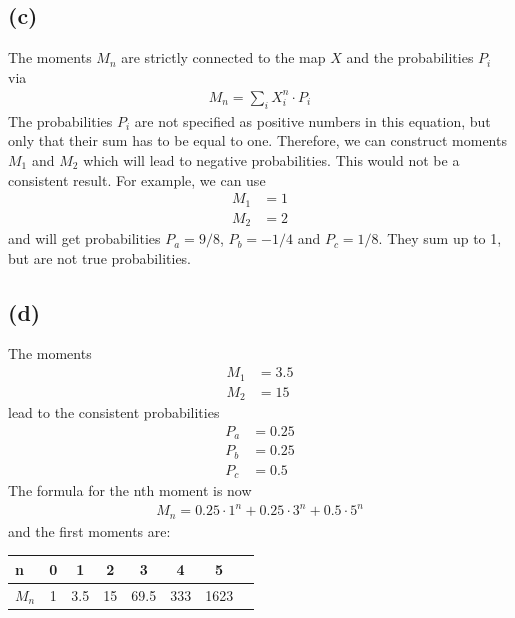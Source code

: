 \documentclass{article}
\begin{document}
\subsection*{(c)}
The moments $M_n$ are strictly connected to the map $X$ and the probabilities $P_i$ via
\begin{align}
    M_n = \sum_{i} X_{i}^{n} \cdot P_i
\end{align}
The probabilities $P_i$ are not specified as positive numbers in this equation, but only that their sum has to be equal to one. Therefore, we can construct moments $M_1$ and $M_2$ which will lead to negative probabilities. This would not be a consistent result. For example, we can use
\begin{align}
    M_1 &= 1 \\
    M_2 &= 2
\end{align}
and will get probabilities $P_a = 9/8$, $P_b = -1/4$ and $P_c = 1/8$. They sum up to 1, but are not true probabilities.

\subsection*{(d)}
The moments
\begin{align}
M_1 &= 3.5 \\
M_2 &= 15
\end{align}
lead to the consistent probabilities
\begin{align}
P_a &= 0.25 \\
P_b &= 0.25 \\
P_c &= 0.5
\end{align}
The formula for the nth moment is now
\begin{align}
M_n = 0.25 \cdot 1^n + 0.25 \cdot 3^n + 0.5 \cdot 5^n
\end{align}
and the first moments are:
\begin{table}[h]
\centering
\begin{tabular}{l|ccccccc}
\toprule
n & 0 & 1 & 2 & 3 & 4 & 5 \\
\midrule
$M_n$ & 1 & 3.5 & 15 & 69.5 & 333 & 1623 \\
\bottomrule
\end{tabular}
\end{table}
\end{document}
